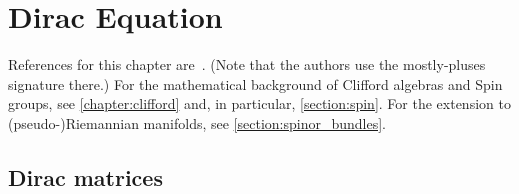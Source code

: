 \chapter{Dirac Equation}\label{chapter:dirac}

    References for this chapter are~\citet{van_proeyen_supergravity_2012}. (Note that the authors use the mostly-pluses signature there.) For the mathematical background of Clifford algebras and Spin groups, see \cref{chapter:clifford} and, in particular, \cref{section:spin}. For the extension to (pseudo-)Riemannian manifolds, see \cref{section:spinor_bundles}.

\section{Dirac matrices}

